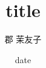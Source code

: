 \documentclass[unicode,12pt]{beamer}%
\title{title}
\author{郡 茉友子}
\date{date}
\begin{document}
\maketitle

\begin{frame}{}
\end{frame}
\end{document}
